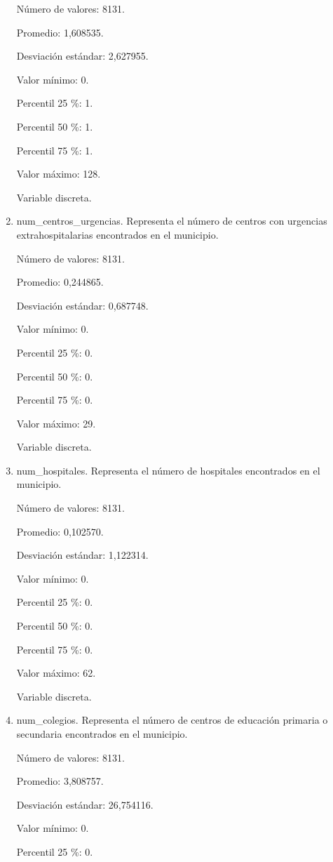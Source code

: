 \begin{enumerate}
	Número de valores: 8131.
	
	Promedio: 1,608535.
	
	Desviación estándar: 2,627955.
	
	Valor mínimo: 0.
	
	Percentil 25 \%: 1.
	
	Percentil 50 \%: 1.
	
	Percentil 75 \%: 1.
	
	Valor máximo: 128.
	
	Variable discreta.

	\item num\_centros\_urgencias. Representa el número de centros con urgencias extrahospitalarias encontrados en el municipio.
	
	Número de valores: 8131.
	
	Promedio: 0,244865.
	
	Desviación estándar: 0,687748.
	
	Valor mínimo: 0.
	
	Percentil 25 \%: 0.
	
	Percentil 50 \%: 0.
	
	Percentil 75 \%: 0.
	
	Valor máximo: 29.
	
	Variable discreta.

	\item num\_hospitales. Representa el número de hospitales encontrados en el municipio.
	
	Número de valores: 8131.
	
	Promedio: 0,102570.
	
	Desviación estándar: 1,122314.
	
	Valor mínimo: 0.
	
	Percentil 25 \%: 0.
	
	Percentil 50 \%: 0.
	
	Percentil 75 \%: 0.
	
	Valor máximo: 62.
	
	Variable discreta.

	\item num\_colegios. Representa el número de centros de educación primaria o secundaria encontrados en el municipio.
	
	Número de valores: 8131.
	
	Promedio: 3,808757.
	
	Desviación estándar: 26,754116.
	
	Valor mínimo: 0.
	
	Percentil 25 \%: 0.
	

\end{enumerate}
